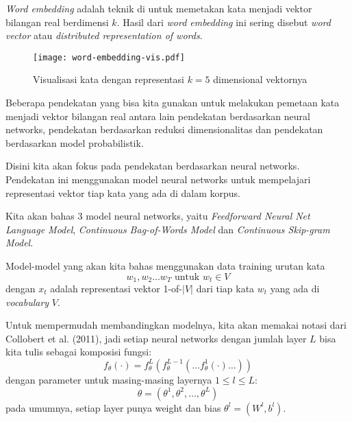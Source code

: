 \documentclass[a4paper,12pt]{tufte-handout}
\begin{document}
\textit{Word embedding} adalah teknik di 
untuk memetakan kata menjadi vektor bilangan real berdimensi $k$. 
Hasil dari \textit{word embedding} ini sering disebut 
\textit{word vector} atau \textit{distributed representation of words}.
\nocite{mikolov:NAACL-HLT-2013}
\nocite{DBLP:journals/corr/MikolovSCCD13}

\begin{figure}
  \begin{center}
  \texttt{[image: word-embedding-vis.pdf]}
  \end{center}
  \caption{Visualisasi kata dengan representasi $k=5$ dimensional vektornya}
\end{figure}

Beberapa pendekatan yang bisa kita gunakan untuk melakukan pemetaan 
kata menjadi vektor bilangan real antara lain pendekatan berdasarkan  
neural networks, pendekatan berdasarkan
reduksi dimensionalitas\cite{DBLP:journals/corr/LebretL13}
dan pendekatan berdasarkan model probabilistik.\cite{
globerson2007euclidean}

Disini kita akan fokus pada pendekatan berdasarkan 
neural networks. Pendekatan ini menggunakan model 
neural networks untuk mempelajari representasi vektor 
tiap kata yang ada di dalam korpus. 

Kita akan bahas 3 model neural networks, yaitu
\textit{Feedforward Neural Net Language Model}, 
\textit{Continuous Bag-of-Words Model} dan 
\textit{Continuous Skip-gram Model}.

Model-model yang akan kita bahas menggunakan data training urutan kata
$$w_{1}, w_{2} \ldots w_{T} \mbox{ untuk } w_{t} \in V$$
dengan $x_{t}$ adalah representasi vektor 1-of-$|V|$ dari tiap
kata $w_{t}$ yang ada di \textit{vocabulary} $V$.

Untuk mempermudah membandingkan modelnya, kita akan memakai notasi
dari Collobert et al. (2011), jadi
setiap neural networks dengan jumlah layer $L$ bisa kita 
tulis sebagai komposisi fungsi:
\nocite{DBLP:journals/corr/abs-1103-0398}
$$
f_{\theta} \left( \cdot \right) = f_{\theta}^{L} \left( 
f_{\theta}^{L-1} \left( \ldots f_{\theta}^{1} \left( \cdot \right) \ldots \right)
\right)
$$
dengan parameter untuk masing-masing layernya $1 \leq l \leq L$:
$$
  \theta = \left(\theta^{1}, \theta^{2}, \ldots ,\theta^{L}\right)
$$
pada umumnya, setiap layer punya weight dan bias $\theta^{l}=(W^{l},b^{l})$.
\end{document}
